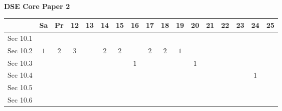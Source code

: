 \documentclass[12pt, a4paper]{article}
\begin{document}
\begin{absolutelynopagebreak}
\begin{center}
\textbf{DSE Core Paper 2}
\end{center}
\begin{center}
\begin{tabular}{|l|c|c|c|c|c|c|c|c|c|c|c|c|c|c|c|c|}
\hline
        & Sa & Pr & 12 & 13 & 14 & 15 & 16 & 17 & 18 & 19 & 20 & 21 & 22 & 23 & 24 & 25 \\\hline\hline
Sec 10.1 &  &  &  &  &  &  &  &  &  &  &  &  &  &  &  &  \\\hline
Sec 10.2 &  $1$ &  $2$ &  $3$ &  &  $2$ &  $2$ &  &  $2$ &  $2$ &  $1$ &  &  &  &  &  &  \\\hline
Sec 10.3 &  &  &  &  &  &  &  $1$ &  &  &  &  $1$ &  &  &  &  &  \\\hline
Sec 10.4 &  &  &  &  &  &  &  &  &  &  &  &  &  &  &  $1$ &  \\\hline
Sec 10.5 &  &  &  &  &  &  &  &  &  &  &  &  &  &  &  &  \\\hline
Sec 10.6 &  &  &  &  &  &  &  &  &  &  &  &  &  &  &  &  \\\hline
\end{tabular}
\end{center}
\end{absolutelynopagebreak}
\end{document}
